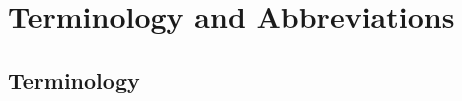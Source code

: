 

\newcommand{\researchquestion}[2]{%
  \par\medskip\noindent
  \begingroup
  \setlength{\fboxsep}{8pt}%
  {\color{black!60}\vrule width 3pt}%
  \colorbox{gray!10}{%
    \begin{minipage}{\dimexpr\linewidth-3pt-2\fboxsep\relax}
      {\small\color{black!60} Research question #1}\par\vspace{2pt}
      \textbf{#2}
    \end{minipage}}%
  \endgroup
  \par\medskip}

\chapter*{Terminology and Abbreviations}

\section*{Terminology}

